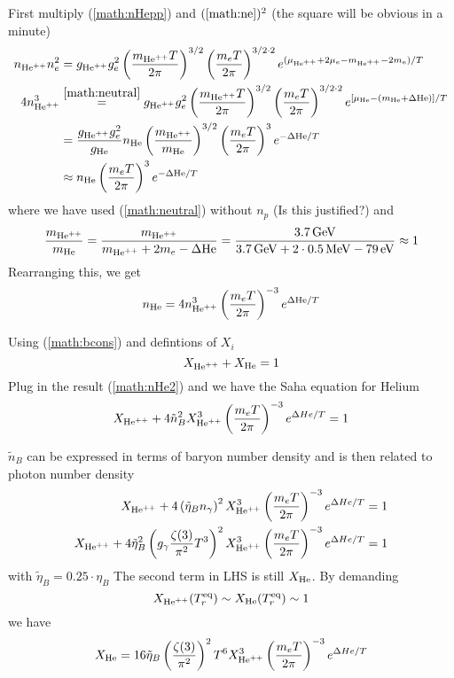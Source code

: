 \begin{enumerate}[label=(\alph*)]
      First multiply (\ref{math:nHepp}) and $(\ref{math:ne})^2$ (the square will be obvious in a minute)
      \begin{align*}
         n_{\text{He}^{++}} n_e^2 &= g_{\text{He}^{++}} g_e^2 \left( \frac{m_{\text{He}^{++}} T}{2\pi} \right)^{3/2} \left( \frac{m_e T}{2\pi} \right)^{3/2 \cdot 2} e^{(\mu_{\text{He}^{++}} + 2 \mu_e - m_{\text{He}^{++}} - 2m_e)/T} \\
         4 n^3_{\text{He}^{++}} &\stackrel{\ref{math:neutral}}{=} g_{\text{He}^{++}} g_e^2 \left( \frac{m_{\text{He}^{++}} T}{2\pi} \right)^{3/2} \left( \frac{m_e T}{2\pi} \right)^{3/2 \cdot 2} e^{[\mu_{\text{He}} - (m_{\text{He}} + \Delta \text{He})]/T} \\
                     &= \frac{g_{\text{He}^{++}} g_e^2}{g_{\text{He}}} n_{\text{He}} \left( \frac{m_{\text{He}^{++}}}{m_{\text{He}}} \right)^{3/2} \left( \frac{m_e T}{2\pi} \right)^3 e^{-\Delta \text{He} /T} \\
                     &\approx n_{\text{He}} \left( \frac{m_e T}{2\pi} \right)^3 e^{-\Delta \text{He} /T}
      \end{align*}
      where we have used (\ref{math:neutral}) without $n_p$ (Is this justified?) and 
      \begin{equation*}
         \frac{m_\Hepp}{m_\He} = \frac{m_\Hepp}{m_\Hepp + 2 m_e - \Delta \He} = \frac{\SI{3.7}{\giga \eV}}{\SI{3.7}{\giga \eV} + 2 \cdot \SI{0.5}{\mega \eV} - \SI{79}{\eV}} \approx 1
      \end{equation*}
      Rearranging this, we get
      \begin{equation}
         n_{\text{He}} = 4 n^3_{\text{He}^{++}} \left( \frac{m_e T}{2\pi} \right)^{-3} e^{\Delta \text{He} /T} \label{math:nHe2}
      \end{equation}

      Using (\ref{math:bcons}) and defintions of $X_i$
      \begin{equation}
         X_{\text{He}^{++}} + X_{\text{He}} = 1
      \end{equation} 
      Plug in the result (\ref{math:nHe2}) and we have the Saha equation for Helium
      \begin{equation}
         X_{\text{He}^{++}} + 4 \tilde{n}_B^2 X_{\text{He}^{++}}^3 \left( \frac{m_e T}{2\pi} \right)^{-3} e^{\Delta He/T}= 1
      \end{equation}

      $\tilde{n}_B$ can be expressed in terms of baryon number density and is then related to photon number density
      \begin{align*}
         X_{\text{He}^{++}} + 4 \left( \tilde{\eta}_B n_\gamma \right)^2 X_{\text{He}^{++}}^3 \left( \frac{m_e T}{2\pi} \right)^{-3} e^{\Delta He/T} &= 1 \\
         X_{\text{He}^{++}} +  4 \tilde\eta_B^2 \left( g_\gamma \frac{\zeta(3)}{\pi^2} T^3 \right)^2 X_{\text{He}^{++}}^3 \left( \frac{m_e T}{2\pi} \right)^{-3} e^{\Delta He/T} &= 1
      \end{align*}
      with $\tilde{\eta}_B = 0.25 \cdot \eta_B$
      The second term in LHS is still $X_{\text{He}}$. By demanding
      \begin{equation}
         X_{\text{He}^{++}}(T^{\text{eq}}_r) \sim X_{\text{He}} (T^{\text{eq}}_r) \sim 1 
      \end{equation}
      we have
      \begin{align*}
         X_{\text{He}} = 16 \tilde\eta_B \left(\frac{\zeta(3)}{\pi^2} \right)^2  T^6 X_{\text{He}^{++}}^3 \left( \frac{m_e T}{2\pi} \right)^{-3} e^{\Delta He/T}
      \end{align*}


\end{enumerate}

